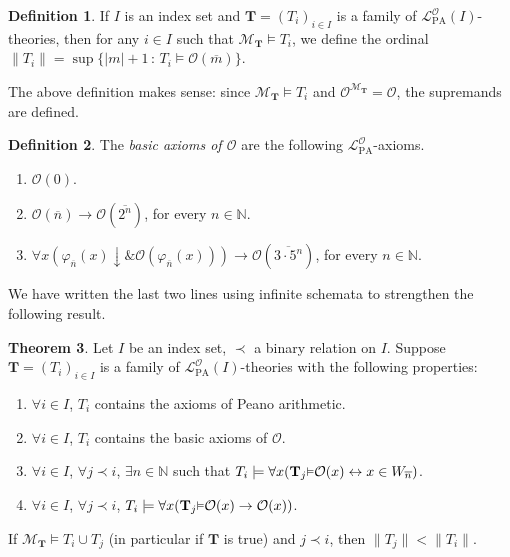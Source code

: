 \documentclass[reqno]{article}
\theoremstyle{definition}
\newtheorem{theorem}{Theorem}
\newtheorem{definition}[theorem]{Definition}
\def\N{\mathbb{N}}
\def\L{\mathscr{L}}
\def\M{\mathscr{M}}
\def\T{\mathbf{T}}
\def\O{\mathcal{O}}
\def\LPO{\L^{\mathcal{O}}_{\mathrm{PA}}}
\renewcommand{\Pr}[1]{\T_{#1}\mbox{\small${\vDash}$}}
\begin{document}
\begin{definition}
If $I$ is an index set and 
$\T=(T_i)_{i\in I}$ is a family of $\LPO(I)$-theories,
then for any $i\in I$
such that $\M_\T\models T_i$,
we define the ordinal $\|T_i\|=\sup\{|m|+1\,:\,T_i\models\O(\overline m)\}$.
\end{definition}

The above definition makes sense:
since $\M_\T\models T_i$
and $\O^{\M_\T}=\O$,
the supremands are defined.



\begin{definition}
\label{basicaxiomsofodefn}
The \emph{basic axioms of $\O$} are the following $\LPO$-axioms.
\begin{enumerate}
\item $\O(0)$.
\item $\O(\overline n)\rightarrow \O(\overline{2^n})$, for every $n\in\N$.
\item $\forall x(\varphi_{\overline n}(x){\downarrow}\mathrel{\&}\O(\varphi_{\overline n}(x)))
\rightarrow
\O(\overline{3\cdot 5^n})$, for every $n\in\N$.
\end{enumerate}
\end{definition}

We have written the last two lines using infinite schemata
to strengthen the following result.

\begin{theorem}
\label{olanguagestructurethm}
Let $I$ be an index set,
$\prec$ a binary relation on $I$.
Suppose $\T=(T_i)_{i\in I}$
is a family of $\LPO(I)$-theories
with the following properties:
\begin{enumerate}
\item $\forall i\in I$, $T_i$ contains the axioms of Peano arithmetic.
\item $\forall i\in I$, $T_i$ contains the basic axioms of $\O$.
\item $\forall i\in I$, $\forall j\prec i$, $\exists n\in\N$
such that $T_i\models\forall x(\Pr j\O(x)\leftrightarrow x\in W_{\overline n})$.
\item $\forall i\in I$, $\forall j\prec i$, $T_i\models \forall x(\Pr j\O(x)\rightarrow\O(x))$.
\end{enumerate}
If $\M_\T\models T_i\cup T_j$ (in particular if $\T$ is true)
and $j\prec i$, then $\|T_j\|<\|T_i\|$.
\end{theorem}
\end{document}
